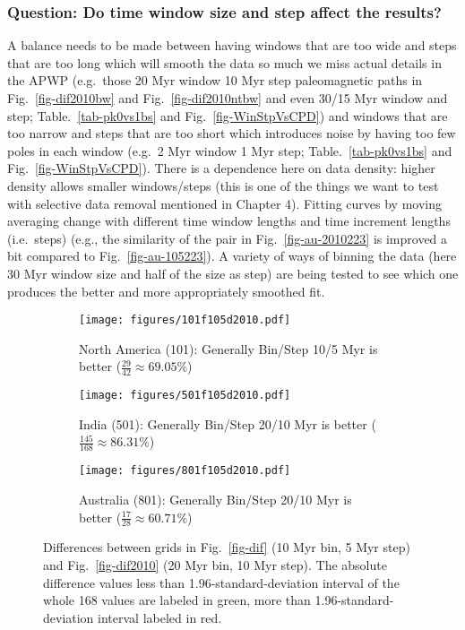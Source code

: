 \subsubsection{Question: Do time window size and step affect the results?}

A balance needs to be made between having windows that are too wide and steps
that are too long which will smooth the data so much we miss actual details in
the APWP (e.g.\ those 20 Myr window 10 Myr step paleomagnetic paths in
Fig.~\ref{fig-dif2010bw} and Fig.~\ref{fig-dif2010ntbw} and even 30/15 Myr
window and step; Table.~\ref{tab-pk0vs1bs} and Fig.~\ref{fig-WinStpVsCPD}) and
windows that are too narrow and steps that are too short which introduces noise
by having too few poles in each window (e.g.\ 2 Myr window 1 Myr step;
Table.~\ref{tab-pk0vs1bs} and Fig.~\ref{fig-WinStpVsCPD}). There is a dependence
here on data density: higher density allows smaller windows/steps (this is one
of the things we want to test with selective data removal mentioned in Chapter
4). Fitting curves by moving averaging change with different time window lengths
and time increment lengths (i.e.\ steps) (e.g., the similarity of the pair in
Fig.~\ref{fig-au-2010223} is improved a bit compared to
Fig.~\ref{fig-au-105223}). A variety of ways of binning the data (here
30 Myr window size and half of the size as step) are being tested to
see which one produces the better and more appropriately smoothed fit.

\begin{figure*}
	\centering
	\begin{subfigure}{1.01\textwidth}
		\texttt{[image: figures/101f105d2010.pdf]}
		\caption{North America (101): Generally Bin/Step 10/5 Myr is better
		($\frac{29}{42}\approx69.05\%$)}\label{fig-101f105d2010}
	\end{subfigure}
	\vspace{1em}
	\begin{subfigure}{1.01\textwidth}
		\texttt{[image: figures/501f105d2010.pdf]}
		\caption{India (501): Generally Bin/Step 20/10 Myr is better
		($\frac{145}{168}\approx86.31\%$)}\label{fig-501f105d2010}
	\end{subfigure}
	\vspace{1em}
	\begin{subfigure}{1.01\textwidth}
		\texttt{[image: figures/801f105d2010.pdf]}
		\caption{Australia (801): Generally Bin/Step 20/10 Myr is better
		($\frac{17}{28}\approx60.71\%$)}\label{fig-801f105d2010}
	\end{subfigure}
	\caption[]{Differences between grids in Fig.~\ref{fig-dif} (10 Myr bin, 5
Myr step) and Fig.~\ref{fig-dif2010} (20 Myr bin, 10 Myr step). The absolute
difference values less than 1.96-standard-deviation interval of the whole 168
values are labeled in green, more than 1.96-standard-deviation interval labeled
in red.}\label{fig-f105d2010}
\end{figure*}

